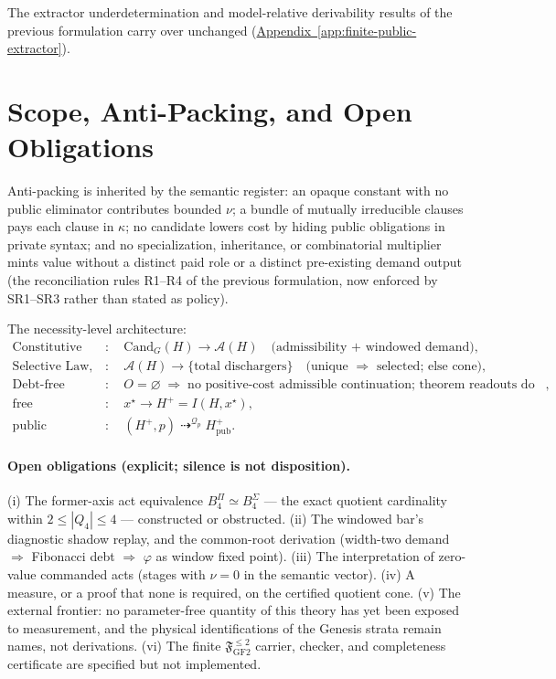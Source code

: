 The extractor underdetermination and model-relative derivability results of
the previous formulation carry over unchanged
(\hyperref[app:finite-public-extractor]{Appendix~\ref*{app:finite-public-extractor}}).

\section{Scope, Anti-Packing, and Open Obligations}

Anti-packing is inherited by the semantic register: an opaque constant with
no public eliminator contributes bounded \(\nu\); a bundle of mutually
irreducible clauses pays each clause in \(\kappa\); no candidate lowers cost
by hiding public obligations in private syntax; and no specialization,
inheritance, or combinatorial multiplier mints value without a distinct paid
role or a distinct pre-existing demand output (the reconciliation rules
R1--R4 of the previous formulation, now enforced by SR1--SR3 rather than
stated as policy).

The necessity-level architecture:
\[
\begin{aligned}
\text{Constitutive Law}
&:\quad
\mathrm{Cand}_G(H)\longrightarrow \mathcal{A}(H)
\quad\text{(admissibility + windowed demand)},\\
\text{Selective Law, guarded}
&:\quad
\mathcal{A}(H)\longrightarrow
\{\text{total dischargers}\}
\quad\text{(unique }\Rightarrow\text{ selected; else cone)},\\
\text{Debt-free termination}
&:\quad
O=\varnothing\;\Longrightarrow\;
\text{no positive-cost admissible continuation; theorem readouts do not
extend history --- halt},\\
\text{free integration}
&:\quad
x^\star\longrightarrow H^+=I(H,x^\star),\\
\text{public physical sealing}
&:\quad
(H^+,p)\mathrel{\mathop{\dashrightarrow}^{\mathcal Q_p}}H^+_{\mathrm{pub}}.
\end{aligned}
\]

\paragraph{Open obligations (explicit; silence is not disposition).}
(i) The former-axis act equivalence \(B_4^{\Pi}\simeq B_4^{\Sigma}\) ---
the exact quotient cardinality within \(2\le|Q_4|\le4\) --- constructed or
obstructed.
(ii) The windowed bar's diagnostic shadow replay, and the
common-root derivation (width-two demand \(\Rightarrow\) Fibonacci debt
\(\Rightarrow\) \(\varphi\) as window fixed point).
(iii) The interpretation of zero-value commanded acts (stages with
\(\nu=0\) in the semantic vector). (iv) A measure, or a proof that none is
required, on the certified quotient cone. (v) The external frontier: no
parameter-free quantity of this theory has yet been exposed to measurement,
and the physical identifications of the Genesis strata remain names, not
derivations. (vi) The finite
\(\mathfrak F_{\mathrm{GF2}}^{\le2}\) carrier, checker, and completeness
certificate are specified but not implemented.

